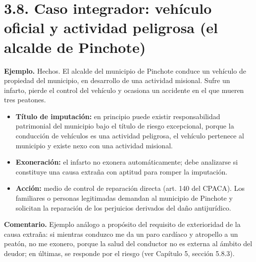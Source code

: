 \section{3.8. Caso integrador: vehículo oficial y actividad peligrosa (el alcalde de Pinchote)}
\begin{ejemplo}
\textcolor[HTML]{4F6228}{\textbf{Ejemplo. }}Hechos. El alcalde del municipio de Pinchote conduce un vehículo de propiedad del municipio, en desarrollo de una actividad misional. Sufre un infarto, pierde el control del vehículo y ocasiona un accidente en el que mueren tres peatones.
\end{ejemplo}
\begin{itemize}
\item \textbf{Título de imputación:} en principio puede existir responsabilidad patrimonial del municipio bajo el título de riesgo excepcional, porque la conducción de vehículos es una actividad peligrosa, el vehículo pertenece al municipio y existe nexo con una actividad misional.
\item \textbf{Exoneración:} el infarto no exonera automáticamente; debe analizarse si constituye una causa extraña con aptitud para romper la imputación.
\item \textbf{Acción:} medio de control de reparación directa (art. 140 del CPACA). Los familiares o personas legitimadas demandan al municipio de Pinchote y solicitan la reparación de los perjuicios derivados del daño antijurídico.
\end{itemize}
\begin{comentario}
\textcolor[HTML]{8A6D3B}{\textbf{Comentario. }}Ejemplo análogo a propósito del requisito de exterioridad de la causa extraña: si mientras conduzco me da un paro cardíaco y atropello a un peatón, no me exonero, porque la salud del conductor no es externa al ámbito del deudor; en últimas, se responde por el riesgo (ver Capítulo 5, sección 5.8.3).
\end{comentario}
